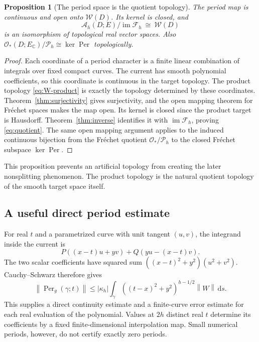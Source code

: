 \documentclass[11pt,a4paper]{article}
\numberwithin{equation}{section}
\newtheorem{proposition}[theorem]{Proposition}
\theoremstyle{definition}
\theoremstyle{remark}
\newcommand{\C}{\mathbb C}
\newcommand{\dd}{\,\mathrm d}
\newcommand{\Hol}{\mathcal O}
\newcommand{\A}{\mathcal A_h}
\newcommand{\Fu}{\mathcal F_h}
\newcommand{\Pspace}{\mathscr P_h}
\newcommand{\Per}{\operatorname{Per}}
\newcommand{\calW}{\mathscr W}
\newcommand{\norm}[1]{\left\lVert#1\right\rVert}
\begin{document}
\begin{proposition}[The period space is the quotient topology]
\label{prop:quotient}
The period map is continuous and open onto $\calW(D)$. Its kernel is closed,
and
\begin{equation}\label{eq:quotient}
 \A(D;E)/\operatorname{im}\Fu\ \cong\ \calW(D)
\end{equation}
is an isomorphism of topological real vector spaces. Also
$\Hol_*(D;E_\C)/\Pspace\cong\ker\Per$ topologically.
\end{proposition}
\begin{proof}
Each coordinate of a period character is a finite linear combination of
integrals over fixed compact curves. The current has smooth polynomial
coefficients, so this coordinate is continuous in the target topology.
The product topology \eqref{eq:W-product} is exactly the topology determined
by these coordinates. Theorem~\ref{thm:surjectivity} gives surjectivity, and
the open mapping theorem for Fr\'echet spaces makes the map open. Its kernel
is closed since the product target is Hausdorff. Theorem~\ref{thm:inverse}
identifies it with $\operatorname{im}\Fu$, proving \eqref{eq:quotient}.
The same open mapping argument applies to the induced continuous bijection
from the Fr\'echet quotient $\Hol_*/\Pspace$ to the closed Fr\'echet subspace
$\ker\Per$.
\end{proof}

This proposition prevents an artificial topology from creating the later
nonsplitting phenomenon. The product topology is the natural quotient
topology of the smooth target space itself.

\subsection{A useful direct period estimate}

For real $t$ and a parametrized curve with unit tangent $(u,v)$, the integrand
inside the current is
\[
 P((x-t)u+yv)+Q(yu-(x-t)v).
\]
The two scalar coefficients have squared sum
$((x-t)^2+y^2)(u^2+v^2)$. Cauchy--Schwarz therefore gives
\begin{equation}\label{eq:period-bound}
 \norm{\Per_g(\gamma;t)}
 \le |\kappa_h|\int_\gamma
       ((t-x)^2+y^2)^{h-1/2}\norm W\dd s.
\end{equation}
This supplies a direct continuity estimate and a finite-curve error estimate
for each real evaluation of the polynomial. Values at $2h$ distinct real
$t$ determine its coefficients by a fixed finite-dimensional interpolation
map. Small numerical periods, however, do not certify exactly zero periods.
\end{document}
